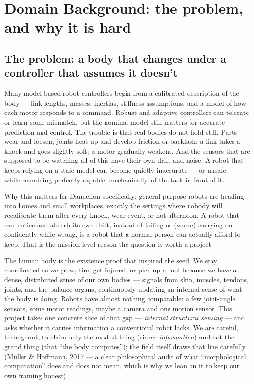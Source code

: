 \documentclass[12pt]{article}
\begin{document}
\section{Domain Background: the problem, and why it is hard}

\subsection{The problem: a body that changes under a controller that assumes it doesn't}

Many model-based robot controllers begin from a calibrated description of the body --- link lengths, masses, inertias, stiffness assumptions, and a model of how each motor responds to a command. Robust and adaptive controllers can tolerate or learn some mismatch, but the nominal model still matters for accurate prediction and control. The trouble is that real bodies do not hold still. Parts wear and loosen; joints heat up and develop friction or backlash; a link takes a knock and goes slightly soft; a motor gradually weakens. And the sensors that are supposed to be watching all of this have their own drift and noise. A robot that keeps relying on a stale model can become quietly inaccurate --- or unsafe --- while remaining perfectly capable, mechanically, of the task in front of it.

Why this matters for Dandelion specifically: general-purpose robots are heading into homes and small workplaces, exactly the settings where nobody will recalibrate them after every knock, wear event, or hot afternoon. A robot that can notice and absorb its own drift, instead of failing or (worse) carrying on confidently while wrong, is a robot that a normal person can actually afford to keep. That is the mission-level reason the question is worth a project.

The human body is the existence proof that inspired the seed. We stay coordinated as we grow, tire, get injured, or pick up a tool because we have a dense, distributed sense of our own bodies --- signals from skin, muscles, tendons, joints, and the balance organs, continuously updating an internal sense of what the body is doing. Robots have almost nothing comparable: a few joint-angle sensors, some motor readings, maybe a camera and one motion sensor. This project takes one concrete slice of that gap --- \emph{internal structural sensing} --- and asks whether it carries information a conventional robot lacks. We are careful, throughout, to claim only the modest thing (richer \emph{information}) and not the grand thing (that ``the body computes''); the field itself draws that line carefully (\href{https://doi.org/10.1162/ARTL_a_00219}{M\"uller \& Hoffmann, 2017} --- a clear philosophical audit of what ``morphological computation'' does and does not mean, which is why we lean on it to keep our own framing honest).
\end{document}
